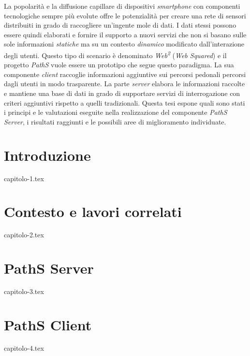 \documentclass[a4paper, 12pt, twoside, openright]{book}
\newenvironment{abstract}{\cleardoublepage \null \vfill \begin{center}\bfseries\abstractname \end{center}}{\vfill\null}
\begin{document}
\begin{abstract} %
\markboth{}{} %
\thispagestyle{empty}
La popolarità e la diffusione capillare di dispositivi \emph{smartphone} con componenti tecnologiche sempre più evolute offre le potenzialità per creare una rete di sensori distribuiti  in grado di raccogliere un'ingente mole di dati. I dati stessi possono essere quindi elaborati e fornire il supporto a nuovi servizi che non si basano sulle sole informazioni \emph{statiche} ma su un contesto \emph{dinamico} modificato dall'interazione degli utenti. Questo tipo di scenario è denominato \emph{Web\textsuperscript{2}} (\emph{Web Squared}) e il progetto \emph{PathS} vuole essere un prototipo che segue questo paradigma. La sua componente \emph{client} raccoglie informazioni aggiuntive sui percorsi pedonali percorsi dagli utenti in modo trasparente. La parte \emph{server} elabora le informazioni raccolte e mantiene una base di dati in grado di supportare servizi di interrogazione con criteri aggiuntivi rispetto a quelli tradizionali.
Questa tesi espone quali sono stati i principi e le valutazioni eseguite nella realizzazione del componente \emph{PathS Server}, i risultati raggiunti e le possibili aree di miglioramento individuate.
\end{abstract}


\mainmatter

\chapter{Introduzione} %
\thispagestyle{empty}
{capitolo-1.tex}

\chapter{Contesto e lavori correlati} %
\thispagestyle{empty}
{capitolo-2.tex}

\chapter{PathS Server} %
\thispagestyle{empty}
{capitolo-3.tex}

\chapter{PathS Client} \label{cap:client} %
\thispagestyle{empty}
{capitolo-4.tex}
\end{document}
